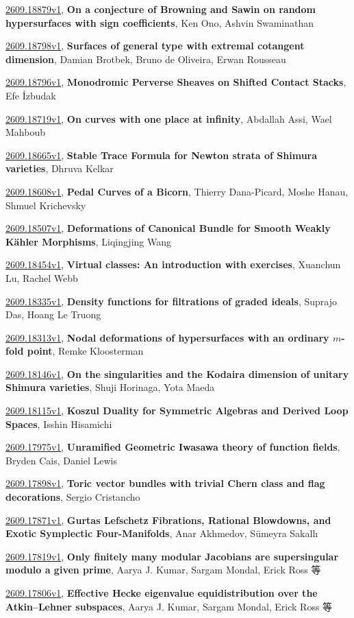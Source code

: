 \documentclass[9pt, a4paper]{article}
\theoremstyle{plain}
\theoremstyle{definition}
\theoremstyle{remark}
\newcommand{\arxiv}[3]{\href{https://arxiv.org/abs/#1}{#1}, \textbf{\textcolor{arxivblue}{#2}}, #3}
\begin{document}
\arxiv{2609.18879v1}{On a conjecture of Browning and Sawin on random hypersurfaces with sign coefficients}{Ken Ono, Ashvin Swaminathan}

\arxiv{2609.18798v1}{Surfaces of general type with extremal cotangent dimension}{Damian Brotbek, Bruno de Oliveira, Erwan Rousseau}

\arxiv{2609.18796v1}{Monodromic Perverse Sheaves on Shifted Contact Stacks}{Efe İzbudak}

\arxiv{2609.18719v1}{On curves with one place at infinity}{Abdallah Assi, Wael Mahboub}

\arxiv{2609.18665v1}{Stable Trace Formula for Newton strata of Shimura varieties}{Dhruva Kelkar}

\arxiv{2609.18608v1}{Pedal Curves of a Bicorn}{Thierry Dana-Picard, Moshe Hanau, Shmuel Krichevsky}

\arxiv{2609.18507v1}{Deformations of Canonical Bundle for Smooth Weakly Kähler Morphisms}{Liqingjing Wang}

\arxiv{2609.18454v1}{Virtual classes: An introduction with exercises}{Xuanchun Lu, Rachel Webb}

\arxiv{2609.18335v1}{Density functions for filtrations of graded ideals}{Suprajo Das, Hoang Le Truong}

\arxiv{2609.18313v1}{Nodal deformations of hypersurfaces with an ordinary $m$-fold point}{Remke Kloosterman}

\arxiv{2609.18146v1}{On the singularities and the Kodaira dimension of unitary Shimura varieties}{Shuji Horinaga, Yota Maeda}

\arxiv{2609.18115v1}{Koszul Duality for Symmetric Algebras and Derived Loop Spaces}{Isshin Hisamichi}

\arxiv{2609.17975v1}{Unramified Geometric Iwasawa theory of function fields}{Bryden Cais, Daniel Lewis}

\arxiv{2609.17898v1}{Toric vector bundles with trivial Chern class and flag decorations}{Sergio Cristancho}

\arxiv{2609.17871v1}{Gurtas Lefschetz Fibrations, Rational Blowdowns, and Exotic Symplectic Four-Manifolds}{Anar Akhmedov, Sümeyra Sakallı}

\arxiv{2609.17819v1}{Only finitely many modular Jacobians are supersingular modulo a given prime}{Aarya J. Kumar, Sargam Mondal, Erick Ross 等}

\arxiv{2609.17806v1}{Effective Hecke eigenvalue equidistribution over the Atkin--Lehner subspaces}{Aarya J. Kumar, Sargam Mondal, Erick Ross 等}
\end{document}
